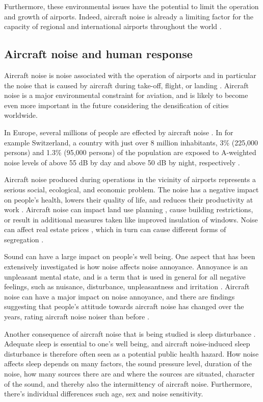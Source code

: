 Furthermore, these environmental issues have the potential to limit the
operation and growth of airports. Indeed, aircraft noise is already a limiting
factor for the capacity of regional and international airports throughout the
world \cite{Zaporozhets2011}.

\subsection{Aircraft noise and human response}
Aircraft noise is noise associated with the operation of airports and in
particular the noise that is caused by aircraft during take-off, flight, or
landing \cite{Zaporozhets2011}. Aircraft noise is a major environmental
constraint for aviation, and is likely to become even more important in the
future considering the densification of cities worldwide.

In Europe, several millions of people are effected by aircraft noise
\cite{MPDGroupLimited2007}. In for example Switzerland, a country with just over
8 million inhabitants, 3\% (225,000 persons) and 1.3\% (95,000 persons) of the
population are exposed to A-weighted noise levels of above 55 dB by day and above
50 dB by night, respectively \cite{Kirk2009,Schaffer2014}.

Aircraft noise produced during operations in the vicinity of airports represents
a serious social, ecological, and economic problem. The noise has a negative
impact on people's health, lowers their quality of life, and reduces their
productivity at work \cite{Zaporozhets2011}. Aircraft noise can impact land use
planning \cite{Freestone2010}, cause building restrictions, or result
in additional measures taken like improved insulation of windows. Noise can
affect real estate prices \cite{Theebe2004}, which in turn can cause different
forms of segregation \cite{Bjornskau2005}.

Sound can have a large impact on people's well being. One aspect that has been
extensively investigated is how noise affects noise annoyance. Annoyance is an
unpleasant mental state, and is a term that is used in general for all negative
feelings, such as nuisance, disturbance, unpleasantness and irritation
\cite{Guski1999}. Aircraft noise can have a major impact on noise annoyance,
and there are findings suggesting that people's attitude towards aircraft noise
has changed over the years, rating aircraft noise noiser than before \cite{Babisch2009}.

Another consequence of aircraft noise that is being studied is sleep disturbance
\cite{Michaud2007}. Adequate sleep is essential to one's well being, and
aircraft noise-induced sleep disturbance is therefore often seen as a potential
public health hazard.
How noise affects sleep depends on many factors, the sound pressure level,
duration of the noise, how many sources there are and where the sources are situated,
character of the sound, and thereby also the intermittency of aircraft noise.
Furthermore, there's individual differences such age, sex and noise sensitivity.


